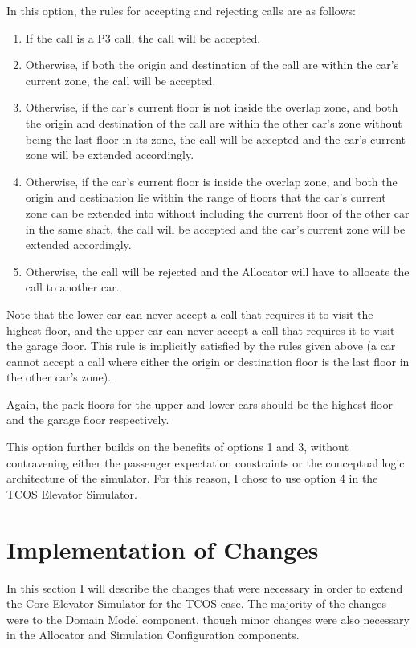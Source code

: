 \documentclass{UoYCSproject}
\begin{document}
In this option, the rules for accepting and rejecting calls are as follows:
	\begin{enumerate}
		\item If the call is a P3 call, the call will be accepted.
		\item Otherwise, if both the origin and destination of the call are within the car's current zone, the call will be accepted.
		\item Otherwise, if the car's current floor is not inside the overlap zone, and both the origin and destination of the call are within the other car's zone without being the last floor in its zone, the call will be accepted and the car's current zone will be extended accordingly.
		\item Otherwise, if the car's current floor is inside the overlap zone, and both the origin and destination lie within the range of floors that the car's current zone can be extended into without including the current floor of the other car in the same shaft, the call will be accepted and the car's current zone will be extended accordingly.
		\item Otherwise, the call will be rejected and the Allocator will have to allocate the call to another car.
	\end{enumerate}

Note that the lower car can never accept a call that requires it to visit the highest floor, and the upper car can never accept a call that requires it to visit the garage floor.  This rule is implicitly satisfied by the rules given above (a car cannot accept a call where either the origin or destination floor is the last floor in the other car's zone).

Again, the park floors for the upper and lower cars should be the highest floor and the garage floor respectively.

This option further builds on the benefits of options 1 and 3, without contravening either the passenger expectation constraints or the conceptual logic architecture of the simulator.  For this reason, I chose to use option 4 in the TCOS Elevator Simulator.

\section{Implementation of Changes}

In this section I will describe the changes that were necessary in order to extend the Core Elevator Simulator for the TCOS case.  The majority of the changes were to the Domain Model component, though minor changes were also necessary in the Allocator and Simulation Configuration components.
\end{document}
